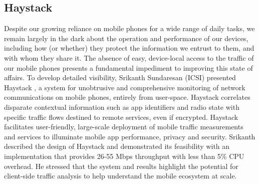 \subsection{Haystack}

Despite our growing reliance on mobile phones for a wide range of daily tasks,
we remain largely in the dark about the operation and performance of our
devices, including how (or whether) they protect the information we entrust to
them, and with whom they share it. The absence of easy, device-local access to
the traffic of our mobile phones presents a fundamental impediment to
improving this state of affairs. To develop detailed visibility, Srikanth
Sundaresan (ICSI) presented Haystack \cite{ssundaresan:arxiv:2015}, a system
for unobtrusive and comprehensive monitoring of network communications on
mobile phones, entirely from user-space. Haystack correlates disparate
contextual information such as app identifiers and radio state with specific
traffic flows destined to remote services, even if encrypted.  Haystack
facilitates user-friendly, large-scale deployment of mobile traffic
measurements and services to illuminate mobile app performance, privacy and
security. Srikanth described the design of Haystack and demonstrated its
feasibility with an implementation that provides 26-55 Mbps throughput with
less than 5\% CPU overhead. He stressed that the system and results highlight
the potential for client-side traffic analysis to help understand the mobile
ecosystem at scale.

